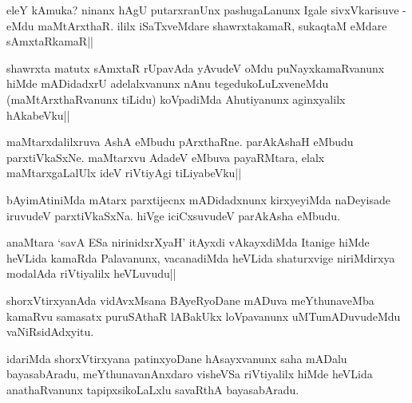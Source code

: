 
\begin{artha}
eleY kAmuka? ninanx hAgU putarxranUnx pashugaLanunx Igale 
sivxVkarisuve - eMdu maMtArxthaR. ililx iSaTxveMdare shawrxtakamaR, 
sukaqtaM eMdare sAmxtaRkamaR||
\end{artha}

\begin{artha}
shawrxta matutx sAmxtaR rUpavAda yAvudeV oMdu puNayxkamaRvanunx hiMde 
mADidadxrU adelalxvanunx nAnu tegedukoLuLxveneMdu (maMtArxthaRvanunx 
tiLidu) koVpadiMda Ahutiyanunx aginxyalilx hAkabeVku||
\end{artha}

\begin{artha}
maMtarxdalilxruva AshA eMbudu pArxthaRne. parAkAshaH eMbudu 
parxtiVkaSxNe. maMtarxvu AdadeV eMbuva payaRMtara, elalx 
maMtarxgaLalUlx ideV riVtiyAgi tiLiyabeVku||
\end{artha}


\begin{artha}
bAyimAtiniMda mAtarx parxtijecnx mADidadxnunx kirxyeyiMda naDeyisade 
iruvudeV parxtiVkaSxNa. hiVge iciCxsuvudeV parAkAsha eMbudu.
\end{artha}


\begin{artha}
anaMtara `savA ESa nirinidxrXyaH' itAyxdi vAkayxdiMda Itanige hiMde 
heVLida kamaRda Palavanunx, vacanadiMda heVLida shaturxvige 
niriMdirxya modalAda riVtiyalilx heVLuvudu||
\end{artha}


\begin{artha}
shorxVtirxyanAda vidAvxMsana BAyeRyoDane mADuva meYthunaveMba kamaRvu 
samasatx puruSAthaR lABakUkx loVpavanunx uMTumADuvudeMdu 
vaNiRsidAdxyitu.
\end{artha}

\begin{artha}
idariMda shorxVtirxyana patinxyoDane hAsayxvanunx saha mADalu 
bayasabAradu, meYthunavanAnxdaro visheVSa riVtiyalilx hiMde heVLida 
anathaRvanunx tapipxsikoLaLxlu savaRthA bayasabAradu.
\end{artha}


